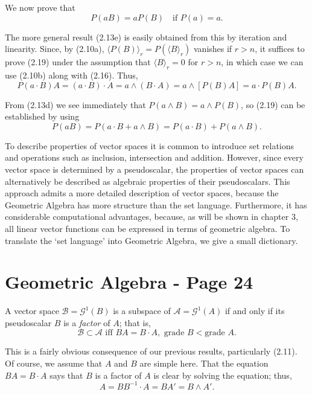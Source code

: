 \documentclass[fleqn]{scrartcl}
\numberwithin{equation}{section}
\begin{document}
\vspace{1em}
\noindent We now prove that
\begin{equation}
P(aB) = aP(B) \quad \text{if } P(a) = a. \tag{2.19}
\end{equation}

\noindent The more general result (2.13e) is easily obtained from this by iteration and linearity. Since, by (2.10a), \(\langle P(B) \rangle_r = P(\langle B \rangle_r)\) vanishes if \(r > n\), it suffices to prove (2.19) under the assumption that \(\langle B \rangle_r = 0\) for \(r > n\), in which case we can use (2.10b) along with (2.16). Thus,
\[
P(a \cdot B)A = (a \cdot B) \cdot A = a \wedge (B \cdot A) = a \wedge [P(B)A] = a \cdot P(B)A.
\]

\noindent From (2.13d) we see immediately that \(P(a \wedge B) = a \wedge P(B)\), so (2.19) can be established by using
\[
P(aB) = P(a \cdot B + a \wedge B) = P(a \cdot B) + P(a \wedge B).
\]

\vspace{1em}
\noindent To describe properties of vector spaces it is common to introduce set relations and operations such as inclusion, intersection and addition. However, since every vector space is determined by a pseudoscalar, the properties of vector spaces can alternatively be described as algebraic properties of their pseudoscalars. This approach admits a more detailed description of vector spaces, because the Geometric Algebra has more structure than the set language. Furthermore, it has considerable computational advantages, because, as will be shown in chapter 3, all linear vector functions can be expressed in terms of geometric algebra. To translate the `set language' into Geometric Algebra, we give a small dictionary.

\section*{Geometric Algebra - Page 24}

\noindent A vector space \(\mathscr{B} = \mathscr{G}^1(B)\) is a subspace of \(\mathscr{A} = \mathscr{G}^1(A)\) if and only if its pseudoscalar \(B\) is a \textit{factor} of \(A\); that is,
\begin{equation}
\mathscr{B} \subset \mathscr{A} \text{ iff } BA = B \cdot A, \text{ grade } B < \text{grade } A. \tag{2.20}
\end{equation}

\noindent This is a fairly obvious consequence of our previous results, particularly (2.11). Of course, we assume that \(A\) and \(B\) are simple here. That the equation \(BA = B \cdot A\) says that \(B\) is a factor of \(A\) is clear by solving the equation; thus,
\[
A = BB^{-1} \cdot A = BA' = B \wedge A'.
\]
\end{document}
